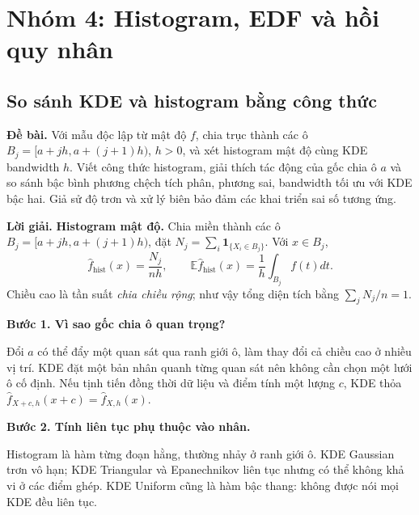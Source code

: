 \documentclass[11pt,a4paper]{article}
\newcommand{\E}{\mathbb E}
\newcommand{\buoc}[1]{\par\medskip\textbf{#1}\par}
\begin{document}
\section{Nhóm 4: Histogram, EDF và hồi quy nhân}
\subsection{So sánh KDE và histogram bằng công thức}\label{sec:hist}
\textbf{Đề bài.} Với mẫu độc lập từ mật độ $f$, chia trục thành các ô
$B_j=[a+jh,a+(j+1)h)$, $h>0$, và xét histogram mật độ cùng KDE bandwidth $h$.
Viết công thức histogram, giải thích tác động của gốc chia ô $a$ và so sánh bậc
bình phương chệch tích phân, phương sai, bandwidth tối ưu với KDE bậc hai.
Giả sử độ trơn và xử lý biên bảo đảm các khai triển sai số tương ứng.

\textbf{Lời giải.}
\textbf{Histogram mật độ.} Chia miền thành các ô $B_j=[a+jh,a+(j+1)h)$, đặt $N_j=\sum_i\mathbf1_{\{X_i\in B_j\}}$. Với $x\in B_j$,
\[
\widehat f_{\mathrm{hist}}(x)=\frac{N_j}{nh},\qquad
\E\widehat f_{\mathrm{hist}}(x)=\frac1h\int_{B_j}f(t)dt.
\]
Chiều cao là tần suất \emph{chia chiều rộng}; như vậy tổng diện tích bằng $\sum_jN_j/n=1$.

\buoc{Bước 1. Vì sao gốc chia ô quan trọng?}
Đổi $a$ có thể đẩy một quan sát qua ranh giới ô, làm thay đổi cả chiều cao ở nhiều vị trí. KDE đặt một bản nhân quanh từng quan sát nên không cần chọn một lưới ô cố định. Nếu tịnh tiến đồng thời dữ liệu và điểm tính một lượng $c$, KDE thỏa $\widehat f_{X+c,h}(x+c)=\widehat f_{X,h}(x)$.

\buoc{Bước 2. Tính liên tục phụ thuộc vào nhân.}
Histogram là hàm từng đoạn hằng, thường nhảy ở ranh giới ô. KDE Gaussian trơn vô hạn; KDE Triangular và Epanechnikov liên tục nhưng có thể không khả vi ở các điểm ghép. KDE Uniform cũng là hàm bậc thang: không được nói mọi KDE đều liên tục.
\end{document}

